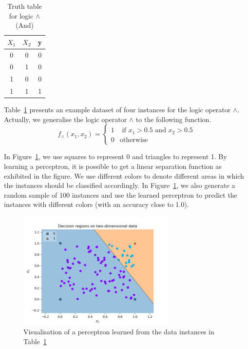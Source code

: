 \begin{example}
\begin{table}[!htbp]
    \centering
    \begin{tabular}{|c|c||c|}
    \hline
     $X_1$  &  $X_2$   &  \textbf{y} \\
     \hline
      0     & 0  & 0 \\
      0 & 1 & 0 \\
      1 & 0 & 0 \\
      1 & 1 & 1 \\
      \hline
    \end{tabular}
    \caption{Truth table for logic $\land$ (And)}
    \label{tab:truthtableand}
\end{table}
Table~\ref{tab:truthtableand} presents an example dataset of four instances for the logic operator $\land$. Actually, we generalise the logic operator $\land $ to the following function. 
\begin{equation}
    f_\land(x_1,x_2) = 
    \begin{cases}
    1 & \text{ if } x_1 > 0.5 \text{ and } x_2 > 0.5 \\
    0 & \text{otherwise}
    \end{cases}
\end{equation}

In Figure~\ref{fig:logicand}, we use squares to represent 0 and triangles to represent 1. By learning a perceptron, it is possible to get a linear separation function as exhibited in the figure. We use different colors to denote different areas in which the instances should be classified accordingly. In Figure~\ref{fig:logicand}, we also generate a random sample of 100 instances and use the learned perceptron to predict the instances with different colors (with an accuracy close to 1.0).  

\begin{figure}[!htbp]
    \centering
    \includegraphics[width=0.7\textwidth]{images/deepLearning/Perceptron/logicand.png}
    \caption{Visualisation of a perceptron learned from the data instances in Table~\ref{tab:truthtableand}}
    \label{fig:logicand}
\end{figure}
\end{example}

